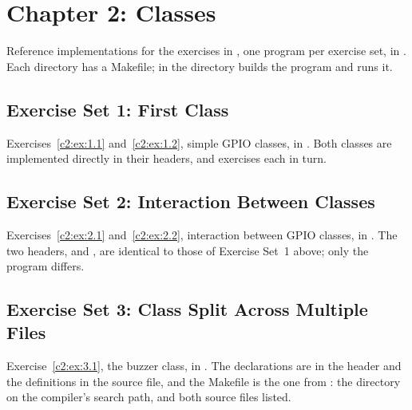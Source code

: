 
\section{Chapter 2: Classes}
\label{sol:sec:c2}
Reference implementations for the exercises in , one program per exercise
set, in . Each directory has a Makefile;  in the
directory builds the program and runs it.

\subsection{Exercise Set 1: First Class}
\label{sol:set:c2.1}
Exercises~\ref{c2:ex:1.1} and~\ref{c2:ex:1.2}, simple GPIO classes, in
. Both classes are implemented directly in their
headers, and  exercises each in turn.


\subsection{Exercise Set 2: Interaction Between Classes}
\label{sol:set:c2.2}
Exercises~\ref{c2:ex:2.1} and~\ref{c2:ex:2.2}, interaction between GPIO classes, in
. The two headers,  and
, are identical to those of Exercise Set~1 above; only the program differs.


\subsection{Exercise Set 3: Class Split Across Multiple Files}
\label{sol:set:c2.3}
Exercise~\ref{c2:ex:3.1}, the buzzer class, in . The
declarations are in the header and the definitions in the source file, and the Makefile is the one
from : the  directory on the compiler's search path, and both
source files listed.


